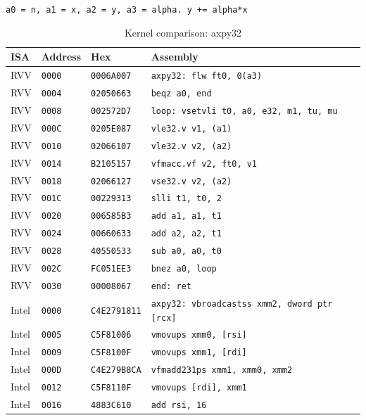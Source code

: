 \begin{table}[htbp]
\centering
\caption{Kernel comparison: axpy32}
\begingroup
\scriptsize
\setlength{\tabcolsep}{4pt}
\noindent \texttt{a0 = n, a1 = x, a2 = y, a3 = alpha. y += alpha*x}\par
\vspace{0.6ex}
\begin{tabular}{@{}l|l|l|p{7.2cm}@{}}
\toprule
ISA & Address & Hex & Assembly \\
\midrule
RVV & \texttt{0000} & \texttt{0006A007} & \texttt{axpy32: flw ft0, 0(a3)} \\
RVV & \texttt{0004} & \texttt{02050663} & \texttt{beqz a0, end} \\
RVV & \texttt{0008} & \texttt{002572D7} & \texttt{loop: vsetvli t0, a0, e32, m1, tu, mu} \\
RVV & \texttt{000C} & \texttt{0205E087} & \texttt{vle32.v v1, (a1)} \\
RVV & \texttt{0010} & \texttt{02066107} & \texttt{vle32.v v2, (a2)} \\
RVV & \texttt{0014} & \texttt{B2105157} & \texttt{vfmacc.vf v2, ft0, v1} \\
RVV & \texttt{0018} & \texttt{02066127} & \texttt{vse32.v v2, (a2)} \\
RVV & \texttt{001C} & \texttt{00229313} & \texttt{slli t1, t0, 2} \\
RVV & \texttt{0020} & \texttt{006585B3} & \texttt{add a1, a1, t1} \\
RVV & \texttt{0024} & \texttt{00660633} & \texttt{add a2, a2, t1} \\
RVV & \texttt{0028} & \texttt{40550533} & \texttt{sub a0, a0, t0} \\
RVV & \texttt{002C} & \texttt{FC051EE3} & \texttt{bnez a0, loop} \\
RVV & \texttt{0030} & \texttt{00008067} & \texttt{end: ret} \\
\midrule
Intel & \texttt{0000} & \texttt{C4E2791811} & \texttt{axpy32: vbroadcastss xmm2, dword ptr [rcx]} \\
Intel & \texttt{0005} & \texttt{C5F81006} & \texttt{vmovups xmm0, [rsi]} \\
Intel & \texttt{0009} & \texttt{C5F8100F} & \texttt{vmovups xmm1, [rdi]} \\
Intel & \texttt{000D} & \texttt{C4E279B8CA} & \texttt{vfmadd231ps xmm1, xmm0, xmm2} \\
Intel & \texttt{0012} & \texttt{C5F8110F} & \texttt{vmovups [rdi], xmm1} \\
Intel & \texttt{0016} & \texttt{4883C610} & \texttt{add rsi, 16} \\

\end{tabular}
\end{table}

